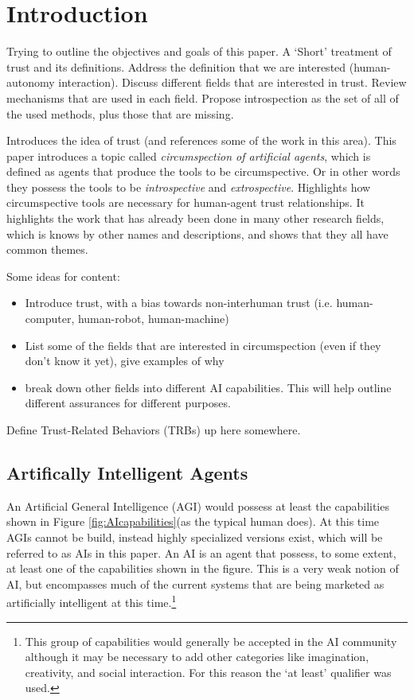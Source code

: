 \section{Introduction}
    Trying to outline the objectives and goals of this paper. A `Short' treatment of trust and its definitions. Address the definition that we are interested (human-autonomy interaction). Discuss different fields that are interested in trust. Review mechanisms that are used in each field. Propose introspection as the set of all of the used methods, plus those that are missing.
    
    Introduces the idea of trust (and references some of the work in this area). This paper introduces a topic called \emph{circumspection of artificial agents}, which is defined as agents that produce the tools to be circumspective. Or in other words they possess the tools to be \emph{introspective} and \emph{extrospective}. Highlights how circumspective tools are necessary for human-agent trust relationships. It highlights the work that has already been done in many other research fields, which is knows by other names and descriptions, and shows that they all have common themes.

    Some ideas for content:

    \begin{itemize}
        \item Introduce trust, with a bias towards non-interhuman trust (i.e. human-computer, human-robot, human-machine)
        \item List some of the fields that are interested in circumspection (even if they don't know it yet), give examples of why
        \item break down other fields into different AI capabilities. This will help outline different assurances for different purposes.
    \end{itemize}

    Define Trust-Related Behaviors (TRBs) up here somewhere.
\subsection{Artifically Intelligent Agents}
    An Artificial General Intelligence (AGI) would possess at least the capabilities shown in Figure \ref{fig:AIcapabilities}(as the typical human does). At this time AGIs cannot be build, instead highly specialized versions exist, which will be referred to as AIs in this paper. An AI is an agent that possess, to some extent, at least one of the capabilities shown in the figure. This is a very weak notion of AI, but encompasses much of the current systems that are being marketed as artificially intelligent at this time.\footnote{This group of capabilities would generally be accepted in the AI community although it may be necessary to add other categories like imagination, creativity, and social interaction. For this reason the `at least' qualifier was used.}


